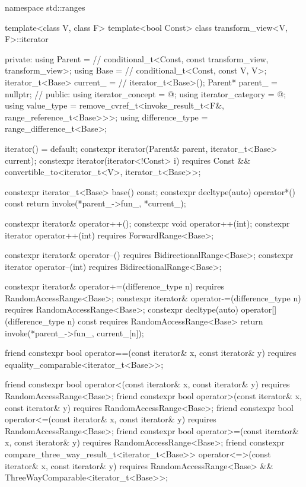 \begin{codeblock}
namespace std::ranges {
  template<class V, class F>
  template<bool Const>
  class transform_view<V, F>::iterator {
  private:
    using Parent =                              // \expos
      conditional_t<Const, const transform_view, transform_view>;
    using Base   =                              // \expos
      conditional_t<Const, const V, V>;
    iterator_t<Base> current_ =                 // \expos
      iterator_t<Base>();
    Parent* parent_ = nullptr;                  // \expos
  public:
    using iterator_concept  = @\seebelow@;
    using iterator_category = @\seebelow@;
    using value_type        =
      remove_cvref_t<invoke_result_t<F&, range_reference_t<Base>>>;
    using difference_type   = range_difference_t<Base>;

    iterator() = default;
    constexpr iterator(Parent& parent, iterator_t<Base> current);
    constexpr iterator(iterator<!Const> i)
      requires Const && convertible_to<iterator_t<V>, iterator_t<Base>>;

    constexpr iterator_t<Base> base() const;
    constexpr decltype(auto) operator*() const
    { return invoke(*parent_->fun_, *current_); }

    constexpr iterator& operator++();
    constexpr void operator++(int);
    constexpr iterator operator++(int) requires ForwardRange<Base>;

    constexpr iterator& operator--() requires BidirectionalRange<Base>;
    constexpr iterator operator--(int) requires BidirectionalRange<Base>;

    constexpr iterator& operator+=(difference_type n)
      requires RandomAccessRange<Base>;
    constexpr iterator& operator-=(difference_type n)
      requires RandomAccessRange<Base>;
    constexpr decltype(auto) operator[](difference_type n) const
      requires RandomAccessRange<Base>
    { return invoke(*parent_->fun_, current_[n]); }

    friend constexpr bool operator==(const iterator& x, const iterator& y)
      requires equality_comparable<iterator_t<Base>>;

    friend constexpr bool operator<(const iterator& x, const iterator& y)
      requires RandomAccessRange<Base>;
    friend constexpr bool operator>(const iterator& x, const iterator& y)
      requires RandomAccessRange<Base>;
    friend constexpr bool operator<=(const iterator& x, const iterator& y)
      requires RandomAccessRange<Base>;
    friend constexpr bool operator>=(const iterator& x, const iterator& y)
      requires RandomAccessRange<Base>;
    friend constexpr compare_three_way_result_t<iterator_t<Base>>
      operator<=>(const iterator& x, const iterator& y)
        requires RandomAccessRange<Base> && ThreeWayComparable<iterator_t<Base>>;

}}
\end{codeblock}

